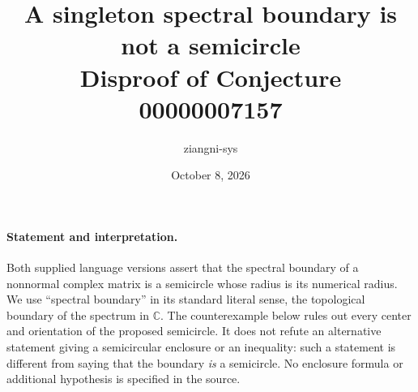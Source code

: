\documentclass[11pt]{article}
\title{A singleton spectral boundary is not a semicircle\\Disproof of Conjecture 00000007157}
\author{ziangni-sys}
\date{October 8, 2026}
\begin{document}
\maketitle

\paragraph{Statement and interpretation.}
Both supplied language versions assert that the spectral boundary of a
nonnormal complex matrix is a semicircle whose radius is its numerical
radius. We use ``spectral boundary'' in its standard literal sense, the
topological boundary of the spectrum in $\mathbb C$. The counterexample
below rules out every center and orientation of the proposed semicircle.
It does not refute an alternative statement giving a semicircular enclosure
or an inequality: such a statement is different from saying that the
boundary \emph{is} a semicircle. No enclosure formula or additional
hypothesis is specified in the source.
\end{document}
